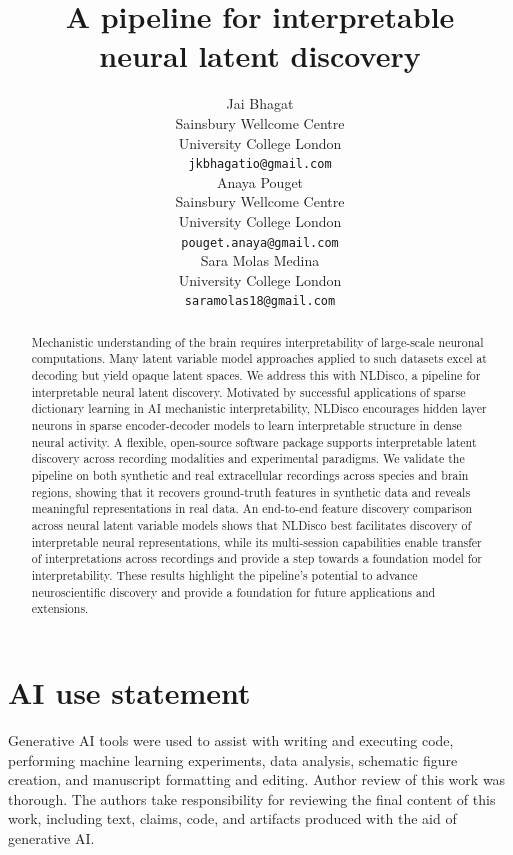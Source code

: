 \documentclass{article}
\title{A pipeline for interpretable \\ neural latent discovery}
\author{
  Jai Bhagat \\
  Sainsbury Wellcome Centre \\
  University College London \\
  \texttt{jkbhagatio@gmail.com} \\
  \And
  Anaya Pouget \\
  Sainsbury Wellcome Centre \\
  University College London \\
  \texttt{pouget.anaya@gmail.com} \\
  \And
  Sara Molas Medina \\
  University College London \\
  \texttt{saramolas18@gmail.com} \\
}
\begin{document}
\maketitle

\begin{abstract}
Mechanistic understanding of the brain requires interpretability of large-scale neuronal computations. Many latent variable model approaches applied to such datasets excel at decoding but yield opaque latent spaces. We address this with NLDisco, a pipeline for interpretable neural latent discovery. Motivated by successful applications of sparse dictionary learning in AI mechanistic interpretability, NLDisco encourages hidden layer neurons in sparse encoder-decoder models to learn interpretable structure in dense neural activity. A flexible, open-source software package supports interpretable latent discovery across recording modalities and experimental paradigms. We validate the pipeline on both synthetic and real extracellular recordings across species and brain regions, showing that it recovers ground-truth features in synthetic data and reveals meaningful representations in real data. An end-to-end feature discovery comparison across neural latent variable models shows that NLDisco best facilitates discovery of interpretable neural representations, while its multi-session capabilities enable transfer of interpretations across recordings and provide a step towards a foundation model for interpretability. These results highlight the pipeline's potential to advance neuroscientific discovery and provide a foundation for future applications and extensions.
\end{abstract}







\newpage

\section*{AI use statement}
Generative AI tools were used to assist with writing and executing code, performing machine learning experiments, data analysis, schematic figure creation, and manuscript formatting and editing. Author review of this work was thorough. The authors take responsibility for reviewing the final content of this work, including text, claims, code, and artifacts produced with the aid of generative AI.



\nocite{lenail_2019_nnsvg}





\newpage


\end{document}
